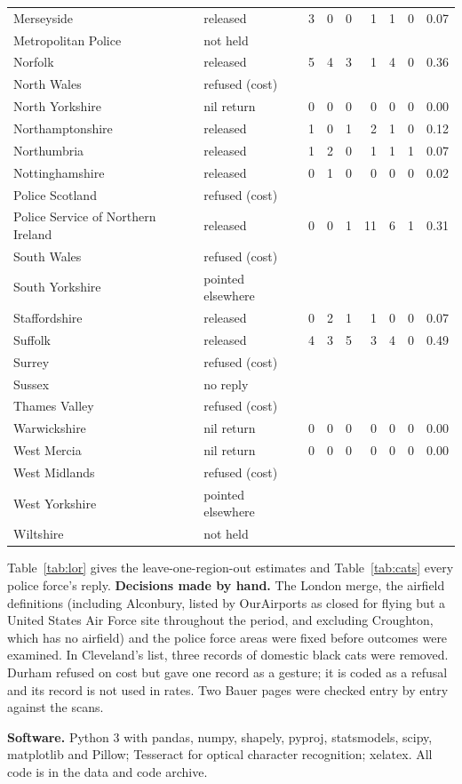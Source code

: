 \documentclass[11pt,a4paper]{article}
\begin{document}
{\begin{longtable}{p{3.6cm}p{2.3cm}rrrrrrr}
Merseyside & released & 3 & 0 & 0 & 1 & 1 & 0 & 0.07\\
Metropolitan Police & not held &  &  &  &  &  &  & \\
Norfolk & released & 5 & 4 & 3 & 1 & 4 & 0 & 0.36\\
North Wales & refused (cost) &  &  &  &  &  &  & \\
North Yorkshire & nil return & 0 & 0 & 0 & 0 & 0 & 0 & 0.00\\
Northamptonshire & released & 1 & 0 & 1 & 2 & 1 & 0 & 0.12\\
Northumbria & released & 1 & 2 & 0 & 1 & 1 & 1 & 0.07\\
Nottinghamshire & released & 0 & 1 & 0 & 0 & 0 & 0 & 0.02\\
Police Scotland & refused (cost) &  &  &  &  &  &  & \\
Police Service of Northern Ireland & released & 0 & 0 & 1 & 11 & 6 & 1 & 0.31\\
South Wales & refused (cost) &  &  &  &  &  &  & \\
South Yorkshire & pointed elsewhere &  &  &  &  &  &  & \\
Staffordshire & released & 0 & 2 & 1 & 1 & 0 & 0 & 0.07\\
Suffolk & released & 4 & 3 & 5 & 3 & 4 & 0 & 0.49\\
Surrey & refused (cost) &  &  &  &  &  &  & \\
Sussex & no reply &  &  &  &  &  &  & \\
Thames Valley & refused (cost) &  &  &  &  &  &  & \\
Warwickshire & nil return & 0 & 0 & 0 & 0 & 0 & 0 & 0.00\\
West Mercia & nil return & 0 & 0 & 0 & 0 & 0 & 0 & 0.00\\
West Midlands & refused (cost) &  &  &  &  &  &  & \\
West Yorkshire & pointed elsewhere &  &  &  &  &  &  & \\
Wiltshire & not held &  &  &  &  &  &  & \\
\bottomrule\end{longtable}}

Table~\ref{tab:lor} gives the leave-one-region-out estimates and Table~\ref{tab:cats} every police force's reply. \textbf{Decisions made by hand.} The London merge, the airfield definitions (including Alconbury, listed by OurAirports as closed for flying but a United States Air Force site throughout the period, and excluding Croughton, which has no airfield) and the police force areas were fixed before outcomes were examined. In Cleveland's list, three records of domestic black cats were removed. Durham refused on cost but gave one record as a gesture; it is coded as a refusal and its record is not used in rates. Two Bauer pages were checked entry by entry against the scans.

\textbf{Software.} Python 3 with pandas, numpy, shapely, pyproj, statsmodels, scipy, matplotlib and Pillow; Tesseract for optical character recognition; xelatex. All code is in the data and code archive.
\end{document}

